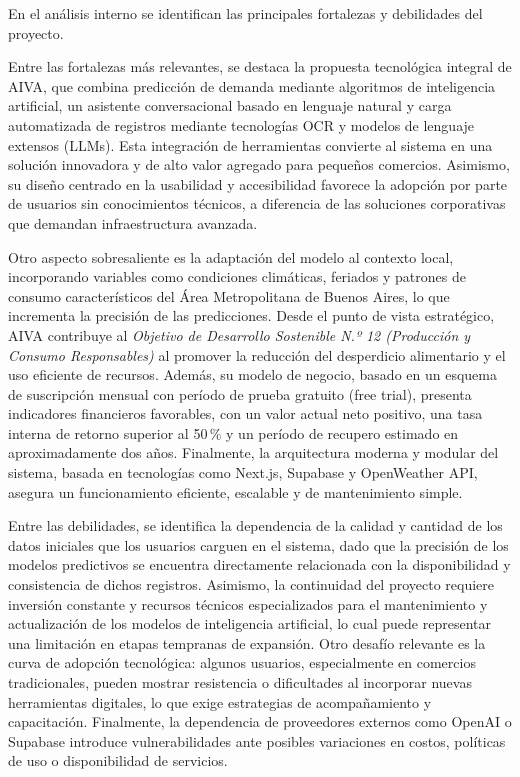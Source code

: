 En el análisis interno se identifican las principales fortalezas y debilidades del proyecto. 

Entre las fortalezas más relevantes, se destaca la propuesta tecnológica integral de AIVA, que combina predicción de demanda mediante algoritmos de inteligencia artificial, un asistente conversacional basado en lenguaje natural y carga automatizada de registros mediante tecnologías OCR y modelos de lenguaje extensos (LLMs). Esta integración de herramientas convierte al sistema en una solución innovadora y de alto valor agregado para pequeños comercios. Asimismo, su diseño centrado en la usabilidad y accesibilidad favorece la adopción por parte de usuarios sin conocimientos técnicos, a diferencia de las soluciones corporativas que demandan infraestructura avanzada. 

Otro aspecto sobresaliente es la adaptación del modelo al contexto local, incorporando variables como condiciones climáticas, feriados y patrones de consumo característicos del Área Metropolitana de Buenos Aires, lo que incrementa la precisión de las predicciones. Desde el punto de vista estratégico, AIVA contribuye al \textit{Objetivo de Desarrollo Sostenible N.º 12 (Producción y Consumo Responsables)} al promover la reducción del desperdicio alimentario y el uso eficiente de recursos. Además, su modelo de negocio, basado en un esquema de suscripción mensual con período de prueba gratuito (free trial), presenta indicadores financieros favorables, con un valor actual neto positivo, una tasa interna de retorno superior al 50\,\% y un período de recupero estimado en aproximadamente dos años. Finalmente, la arquitectura moderna y modular del sistema, basada en tecnologías como Next.js, Supabase y OpenWeather API, asegura un funcionamiento eficiente, escalable y de mantenimiento simple.

Entre las debilidades, se identifica la dependencia de la calidad y cantidad de los datos iniciales que los usuarios carguen en el sistema, dado que la precisión de los modelos predictivos se encuentra directamente relacionada con la disponibilidad y consistencia de dichos registros. Asimismo, la continuidad del proyecto requiere inversión constante y recursos técnicos especializados para el mantenimiento y actualización de los modelos de inteligencia artificial, lo cual puede representar una limitación en etapas tempranas de expansión. Otro desafío relevante es la curva de adopción tecnológica: algunos usuarios, especialmente en comercios tradicionales, pueden mostrar resistencia o dificultades al incorporar nuevas herramientas digitales, lo que exige estrategias de acompañamiento y capacitación. Finalmente, la dependencia de proveedores externos como OpenAI o Supabase introduce vulnerabilidades ante posibles variaciones en costos, políticas de uso o disponibilidad de servicios.

